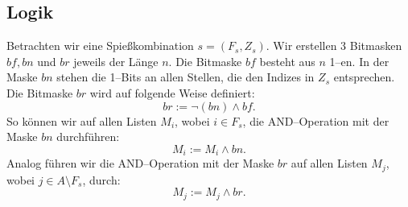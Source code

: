 \subsection{Logik}\label{sec:logik}

Betrachten wir eine Spießkombination $s = (F_s, Z_s)$.
Wir erstellen 3 Bitmasken $bf, bn$ und $br$ jeweils der Länge $n$.
Die Bitmaske $bf$ besteht aus $n$ 1--en.
In der Maske $bn$ stehen die 1--Bits an allen Stellen, die den Indizes in $Z_s$ entsprechen.
Die Bitmaske $br$ wird auf folgende Weise definiert:
\[
br := \neg(bn) \land bf.
\]
\noindent So können wir auf allen Listen $M_i$, wobei $i \in F_s$, die AND--Operation mit der Maske $bn$ 
durchführen:
\[
M_i := M_i \land bn.
\]
Analog führen wir die AND--Operation mit der Maske $br$ auf allen Listen $M_j$,
wobei $j \in A \setminus F_s$, durch:
\[
M_j := M_j \land br.
\]

